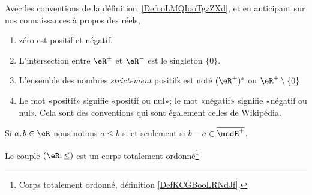 \begin{normaltext}\label{REMooOCXLooKQrDoq}
    Avec les conventions de la définition~\ref{DefooLMQIooTgzZXd}, et en anticipant sur nos connaissances à propos des réels,
    \begin{enumerate}
        \item
            zéro est positif et négatif.
        \item
            L'intersection entre \( \eR^+\) et \( \eR^-\) est le singleton \( \{ 0 \}\).
        \item
            L'ensemble des nombres \emph{strictement} positifs est noté \( (\eR^+)^*\) ou \( \eR^+\setminus\{ 0 \}\).
        \item
            Le mot «positif» signifie «positif ou nul»; le mot «négatif» signifie «négatif ou nul». Cela sont des conventions qui sont également celles de Wikipédia\cite{ooSBSSooTlnuKi}.
    \end{enumerate}

\end{normaltext}

\begin{definition}      \label{DEFooBXHJooOEYPRI}
    Si \( a,b\in \eR\) nous notons \( a\leq b\) si et seulement si \( b-a\in\overline{ \modE^+ }\).
\end{definition}

\begin{proposition} \label{PROPooYMJVooNAsXae}  
    Le couple \( (\eR,\leq)\) est un corps totalement ordonné\footnote{Corps totalement ordonné, définition \ref{DefKCGBooLRNdJf}.}
\end{proposition}

